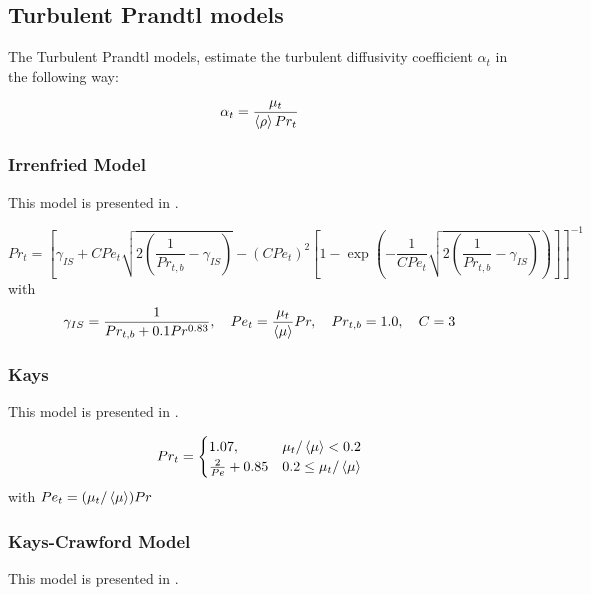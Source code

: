\subsection{Turbulent Prandtl models}

The Turbulent Prandtl models, estimate the turbulent diffusivity coefficient $\alpha_t$ in the following way:

\begin{equation}
\alpha_t = \frac{\mu_t}{\left<{\rho}\right>Pr_t}
\end{equation}




\subsubsection{Irrenfried Model}
This model is presented in \cite{irrenfried2017dns}.

\begin{equation}
Pr_{t} = \left[\gamma_{IS} + C Pe_t \sqrt{2\left(\frac{1}{Pr_{t,b}}-\gamma_{IS}\right)} - (CPe_t)^2 \left[1-\exp\left(-\frac{1}{C Pe_t}\sqrt{2\left(\frac{1}{Pr_{t,b}}-\gamma_{IS}\right)}\right)\right]\right]^{-1}
\end{equation}
with 
\begin{equation}
\gamma_{IS}=\frac{1}{Pr_{t,b}+0.1Pr^{0.83}}, \quad Pe_t = \frac{\mu_t}{\left<{\mu}\right>}Pr, \quad Pr_{t,b} = 1.0, \quad C=3
\end{equation}





\subsubsection{Kays}
This model is presented in \cite{Kays}.

\begin{equation}
  Pr_{t} =
    \begin{cases}
      1.07, & \mu_t/\left<{\mu}\right> < 0.2 \\
      \frac{2}{Pe} +  0.85 & 0.2 \leq \mu_t/\left<{\mu}\right> 
    \end{cases}       
\end{equation}
with $Pe_t = (\mu_t/\left<{\mu}\right>)Pr$





\subsubsection{Kays-Crawford Model}
This model is presented in \cite{kays2012convective}.


